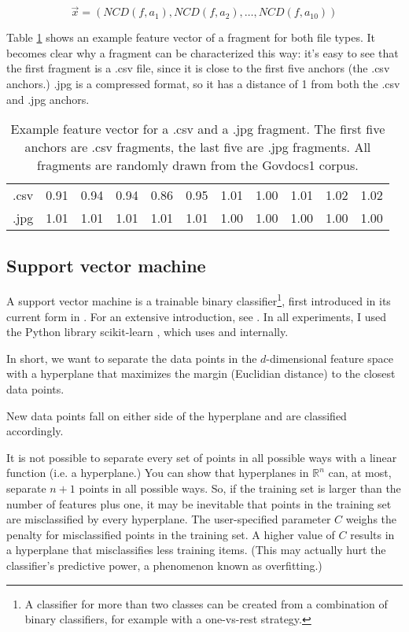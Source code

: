 \begin{equation}\label{}
  \vec{x} = ( NCD(f, a_{1}), NCD(f, a_{2}), \dots, NCD(f, a_{10}) )
\end{equation}

Table \ref{table:feature_vectors} shows an example feature vector of
a fragment for both file types. It becomes clear why a fragment can be
characterized this way: it's easy to see that the first fragment is a .csv
file, since it is close to the first five anchors (the .csv anchors.) .jpg
is a compressed format, so it has a distance of 1 from both the .csv and
.jpg anchors.

\begin{table}
\begin{tabular}{lrrrrrrrrrr}
\hline
 .csv & 0.91 & 0.94 & 0.94 & 0.86 & 0.95 & 1.01 & 1.00 & 1.01 & 1.02 & 1.02 \\
 .jpg & 1.01 & 1.01 & 1.01 & 1.01 & 1.01 & 1.00 & 1.00 & 1.00 & 1.00 & 1.00 \\
\hline
\end{tabular} \caption{Example feature vector for a .csv and a .jpg
fragment. The first five anchors are .csv fragments, the last five are
.jpg fragments. All fragments are randomly drawn from the Govdocs1
corpus.} \label{table:feature_vectors} \end{table}

\subsection{Support vector machine}

A support vector machine is a trainable binary classifier\footnote{A
classifier for more than two classes can be created from a combination of
binary classifiers, for example with a one-vs-rest strategy.}, first introduced in its current form in
\cite{Cortes1995}. For an extensive introduction, see \cite{Burges1998}.
In all experiments, I used the Python library scikit-learn
\cite{Pedregosa2011}, which uses \cite{Fan2014} and \cite{Chang2011}
internally.

In short, we want to separate the data points in the $d$-dimensional
feature space with a hyperplane that maximizes the margin (Euclidian
distance) to the closest data points.

New data points fall on either side of the hyperplane and are classified
accordingly.

It is not possible to separate every set of points in all possible ways
with a linear function (i.e. a hyperplane.) You can show that hyperplanes
in $\mathbb{R}^{n}$ can, at most, separate $n + 1$ points in all possible
ways. So, if the training set is larger than the number of features plus
one, it may be inevitable that points in the training set are
misclassified by every hyperplane. The user-specified parameter $C$ weighs
the penalty for misclassified points in the training set. A higher value
of $C$ results in a hyperplane that misclassifies less training items.
(This may actually hurt the classifier's predictive power, a phenomenon
known as overfitting.)

